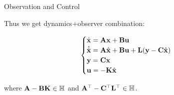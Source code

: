 \documentclass{beamer}
\begin{document}
\begin{frame}{Observation and Control}
\begin{flushleft}

Thus we get dynamics+observer combination:

\begin{equation}
\begin{cases}
\dot {\mathbf{x}} = \mathbf{A} \mathbf{x} + \mathbf{B} \mathbf{u} \\
\hat{\dot {\mathbf{x}}} = \mathbf{A} \hat{\mathbf{x}} + \mathbf{B} \mathbf u + \mathbf{L}(\mathbf y - \mathbf{C} \hat{\mathbf{x}})\\
\mathbf{y} = \mathbf{C} \mathbf{x} \\
\mathbf{u} = -\mathbf{K} \hat{\mathbf{x}}
\end{cases}
\end{equation}

\bigskip

where $\mathbf{A} - \mathbf{B} \mathbf{K} \in \mathbb{H}$ and $\mathbf{A}^{\top} - 
\mathbf{C}^{\top} \mathbf{L}^{\top} \in \mathbb{H}$.


\end{flushleft}
\end{frame}
\end{document}
